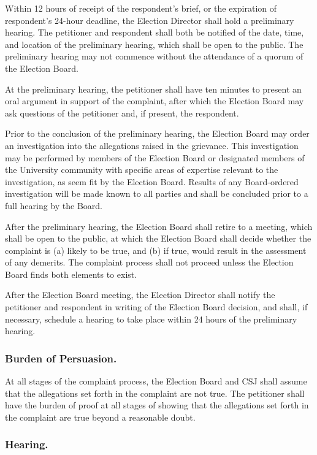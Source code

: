 \subsubsubsection{}
Within 12 hours of receipt of the respondent's brief, or the expiration of respondent's 24-hour deadline, the Election Director shall hold a preliminary hearing.  The petitioner and respondent shall both be notified of the date, time, and location of the preliminary hearing, which shall be open to the public.  The preliminary hearing may not commence without the attendance of a quorum of the Election Board.

\subsubsubsection{}
At the preliminary hearing, the petitioner shall have ten minutes to present an oral argument in support of the complaint, after which the Election Board may ask questions of the petitioner and, if present, the respondent.

\subsubsubsection{}
Prior to the conclusion of the preliminary hearing, the Election Board may order an investigation into the allegations raised in the grievance. This investigation may be performed by members of the Election Board or designated members of the University community with specific areas of expertise relevant to the investigation, as seem fit by the Election Board. Results of any Board-ordered investigation will be made known to all parties and shall be concluded prior to a full hearing by the Board.

\subsubsubsection{}
After the preliminary hearing, the Election Board shall retire to a meeting, which shall be open to the public, at which the Election Board shall decide whether the complaint is (a) likely to be true, and (b) if true, would result in the assessment of any demerits.  The complaint process shall not proceed unless the Election Board finds both elements to exist.  

\subsubsubsection{}
After the Election Board meeting, the Election Director shall notify the petitioner and respondent in writing of the Election Board decision, and shall, if necessary, schedule a hearing to take place within 24 hours of the preliminary hearing.

\subsubsection{Burden of Persuasion.}
At all stages of the complaint process, the Election Board and CSJ shall assume that the allegations set forth in the complaint are not true.  The petitioner shall have the burden of proof at all stages of showing that the allegations set forth in the complaint are true beyond a reasonable doubt.

\subsubsection{Hearing.}

